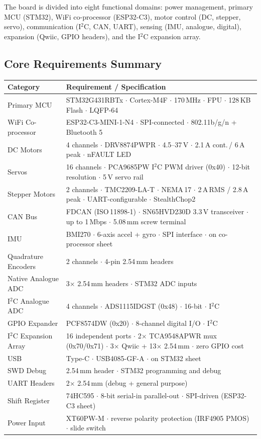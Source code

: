 \documentclass[11pt,a4paper]{article}
\begin{document}
The board is divided into eight functional domains: power management, primary MCU (STM32), WiFi co-processor (ESP32-C3), motor control (DC, stepper, servo), communication (I$^2$C, CAN, UART), sensing (IMU, analogue, digital), expansion (Qwiic, GPIO headers), and the I$^2$C expansion array.

\subsection{Core Requirements Summary}

\begin{longtable}{p{4.5cm} p{10cm}}
  \toprule
  \rowcolor{headergray}\color{white}\textbf{Category} & \color{white}\textbf{Requirement / Specification} \\
  \midrule\endhead
  Primary MCU & STM32G431RBTx $\cdot$ Cortex-M4F $\cdot$ 170\,MHz $\cdot$ FPU $\cdot$ 128\,KB Flash $\cdot$ LQFP-64 \\
  WiFi Co-processor & ESP32-C3-MINI-1-N4 $\cdot$ SPI-connected $\cdot$ 802.11b/g/n + Bluetooth 5 \\
  DC Motors & 4 channels $\cdot$ DRV8874PWPR $\cdot$ 4.5--37\,V $\cdot$ 2.1\,A cont.\,/ 6\,A peak $\cdot$ nFAULT LED \\
  Servos & 16 channels $\cdot$ PCA9685PW I$^2$C PWM driver (0x40) $\cdot$ 12-bit resolution $\cdot$ 5\,V servo rail \\
  Stepper Motors & 2 channels $\cdot$ TMC2209-LA-T $\cdot$ NEMA\,17 $\cdot$ 2\,A\,RMS / 2.8\,A peak $\cdot$ UART-configurable $\cdot$ StealthChop2 \\
  CAN Bus & FDCAN (ISO\,11898-1) $\cdot$ SN65HVD230D 3.3\,V transceiver $\cdot$ up to 1\,Mbps $\cdot$ 5.08\,mm screw terminal \\
  IMU & BMI270 $\cdot$ 6-axis accel + gyro $\cdot$ SPI interface $\cdot$ on co-processor sheet \\
  Quadrature Encoders & 2 channels $\cdot$ 4-pin 2.54\,mm headers \\
  Native Analogue ADC & 3$\times$ 2.54\,mm headers $\cdot$ STM32 ADC inputs \\
  I$^2$C Analogue ADC & 4 channels $\cdot$ ADS1115IDGST (0x48) $\cdot$ 16-bit $\cdot$ I$^2$C \\
  GPIO Expander & PCF8574DW (0x20) $\cdot$ 8-channel digital I/O $\cdot$ I$^2$C \\
  I$^2$C Expansion Array & 16 independent ports $\cdot$ 2$\times$ TCA9548APWR mux (0x70/0x71) $\cdot$ 3$\times$ Qwiic + 13$\times$ 2.54\,mm $\cdot$ zero GPIO cost \\
  USB & Type-C $\cdot$ USB4085-GF-A $\cdot$ on STM32 sheet \\
  SWD Debug & 2.54\,mm header $\cdot$ STM32 programming and debug \\
  UART Headers & 2$\times$ 2.54\,mm (debug + general purpose) \\
  Shift Register & 74HC595 $\cdot$ 8-bit serial-in parallel-out $\cdot$ SPI-driven (ESP32-C3 sheet) \\
  Power Input & XT60PW-M $\cdot$ reverse polarity protection (IRF4905 PMOS) $\cdot$ slide switch \\
  \bottomrule
\end{longtable}
\end{document}
